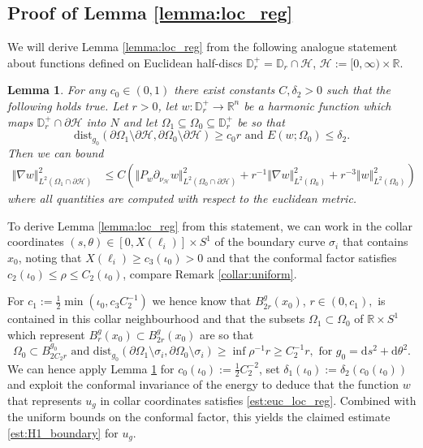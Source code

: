 \documentclass[10pt,reqno]{amsart}
\theoremstyle{plain}
\newtheorem{lemma}{Lemma}[section]
\theoremstyle{definition}
\numberwithin{equation}{section}
\newcommand{\de}{\delta}
\newcommand{\Om}{\Omega}
\newcommand{\si}{\sigma}
\newcommand{\R}{\ensuremath{{\mathbb R}}}
\newcommand{\norm}[1]{\Vert#1\Vert}
\newcommand{\half}{\frac{1}{2}}
\newcommand{\dd}{\mathrm{d}} %
\newcommand{\dist}{\text{dist}}
\newcommand{\HH}{\mathcal{H}} %
\newcommand{\DD}{\mathbb{D}}
\newcommand{\p}{\partial} %
\newcommand{\greq}{\geqslant} %
\newcommand{\subs}{\subseteq} %
\begin{document}
\subsection{Proof of Lemma \ref{lemma:loc_reg}}\label{subsec:loc-reg-lemma}
We will derive Lemma \ref{lemma:loc_reg} from the following analogue statement about functions defined on Euclidean half-discs $\DD_r^+=\DD_r\cap \HH$, $\HH:= [0,\infty)\times \R$. 
\begin{lemma}\label{lemma:loc_reg_euc}
    For any $c_0\in (0,1)$ there exist constants $C,\de_2>0$ such that the following holds true. Let $r>0$, let $w:\DD_r^+\to \R^n $ be a harmonic function which maps $\DD_r^+\cap \p\HH$ into $N$ and let $\Omega_1 \subs \Omega_0 \subs \DD_r^+$ be so that 
    $$\dist_{g_0}(\p\Omega_1 \setminus \p\HH,\p\Omega_0\setminus\p\HH) \greq c_0r \text{ and } E(w;\Omega_0) \leq \de_2.$$
    Then we can bound 
    \begin{align}\label{est:euc_loc_reg}
        \norm{\nabla w}_{L^2(\Omega_1\cap\p\HH)}^2 &\leq C(\norm{P_w \p_{\nu_\HH} w}_{L^2(\Omega_0\cap \p\HH)}^2 + r^{-1}\norm{\nabla w}_{L^2(\Omega_0)}^2 + r^{-3}\norm{w}_{L^2(\Omega_0)}^2)
    \end{align}
    where all quantities are computed with respect to the euclidean metric. 
\end{lemma}


To derive Lemma \ref{lemma:loc_reg} from this statement, we can work in the collar coordinates $(s,\theta)\in [0,X(\ell_i)]\times S^1$ of the boundary curve $\si_i$ that contains $x_0$, noting that $X(\ell_i)\geq c_3(\iota_0)>0$ and that the conformal factor satisfies  $c_2(\iota_0)\leq \rho\leq C_2(\iota_0)$, compare Remark \ref{collar:uniform}. 

For $c_1:=\half \min( \iota_0,c_3 C_2^{-1})$ we hence know that $B_{2r}^g(x_0)$, $r\in (0,c_1),$ is contained in this collar neighbourhood  and that the subsets $\Om_1\subset \Om_0$  of $\R \times S^1$ which represent  $B_r^g(x_0)\subset B_{2r}^g(x_0)$ are so that 
$$\Om_0\subset B_{2C_2r}^{g_0} \text{ and } \dist_{g_0}(\partial \Om_1\setminus \si_i, \partial \Om_0\setminus \si_i)\geq \inf \rho^{-1} r\geq C_2^{-1} r, \text{ for } g_0=\dd s^2 + \dd\theta^2.$$
%
We can hence apply Lemma \ref{lemma:loc_reg_euc} for $c_0(\iota_0):= \half C_2^{-2}$, set $\de_1(\iota_0):= \de_2(c_0(\iota_0))$ and exploit the conformal invariance of the energy to deduce that the function $w$ that represents $u_g$ in collar coordinates satisfies \eqref{est:euc_loc_reg}. Combined with the uniform bounds on the conformal factor, this yields the claimed estimate \eqref{est:H1_boundary} for $u_g$. 
 
\end{document}

